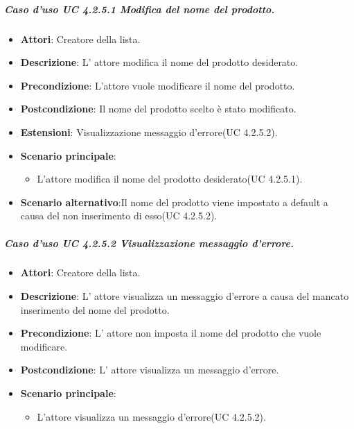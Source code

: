 \subparagraph{Caso d'uso UC 4.2.5.1 Modifica del nome del prodotto.}
	\begin{itemize}
		\item\textbf{Attori}: Creatore della lista.
		\item\textbf{Descrizione}: L' attore modifica il nome del prodotto desiderato.
		\item\textbf{Precondizione}: L'attore vuole modificare il nome del prodotto.
		\item\textbf{Postcondizione}: Il nome del prodotto scelto è stato modificato.
		\item\textbf{Estensioni}: Visualizzazione messaggio d'errore(UC 4.2.5.2).
		\item\textbf{Scenario principale}:
			\begin{itemize}
				\item L'attore modifica il nome del prodotto desiderato(UC 4.2.5.1). 
			\end{itemize}
		\item\textbf{Scenario alternativo}:Il nome del prodotto viene impostato a default a causa del non inserimento di esso(UC 4.2.5.2).
		
	\end{itemize}
	
	

\subparagraph{Caso d'uso UC 4.2.5.2 Visualizzazione messaggio d'errore.}
	\begin{itemize}
		\item\textbf{Attori}: Creatore della lista.
		\item\textbf{Descrizione}: L' attore visualizza un messaggio d'errore a causa del mancato inserimento del nome del prodotto.
		\item\textbf{Precondizione}: L' attore non imposta il nome del prodotto che vuole modificare.
		\item\textbf{Postcondizione}: L' attore visualizza un messaggio d'errore.
		\item\textbf{Scenario principale}:
			\begin{itemize}
				\item L'attore visualizza un messaggio d'errore(UC 4.2.5.2). 
			\end{itemize}
		
	\end{itemize}
	
